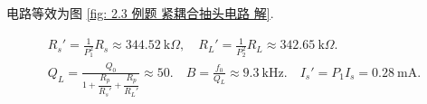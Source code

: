 \begin{exampleprob}
    \begin{solution}
        电路等效为图 \ref{fig: 2.3 例题 紧耦合抽头电路 解}.

        \begin{gather*}
            R_s'=\frac{1}{P_1^2}R_s\approx 344.52\ \mathrm{k}\Omega,\quad R_L'=\frac{1}{P_2^2}R_L\approx 342.65\ \mathrm{k}\Omega. \\
            Q_L=\frac{Q_0}{1+\dfrac{R_p}{R_s'}+\dfrac{R_p}{R_L'}}\approx 50.\quad B=\frac{f_0}{Q_L}\approx 9.3\ \mathrm{kHz}.\quad I_s'=P_1I_s=0.28\ \mathrm{mA}.
        \end{gather*}
    \end{solution}
\end{exampleprob}
